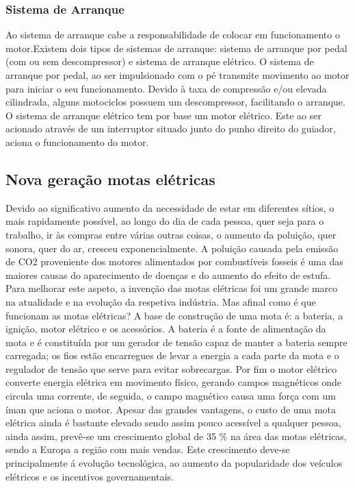 \documentclass{report}
\begin{document}
\subsubsection{Sistema de Arranque}
Ao sistema de arranque cabe a responsabilidade de colocar em funcionamento o motor.Existem dois tipos de sistemas de arranque: sistema de arranque por pedal (com ou sem descompressor) e sistema de arranque elétrico.
O sistema de arranque por pedal, ao ser impulsionado com o pé transmite movimento ao motor para iniciar o seu funcionamento. Devido à taxa de compressão e/ou elevada cilindrada, alguns motociclos possuem um descompressor, facilitando o arranque.
O sistema de arranque elétrico tem por base um motor elétrico. Este ao ser acionado através de um interruptor situado junto do punho direito do guiador, aciona o funcionamento do motor.
\subsection{Nova geração motas elétricas}
Devido ao significativo aumento da necessidade de estar em diferentes sítios, o mais rapidamente possível, ao longo do dia de cada pessoa, quer seja para o trabalho, ir às compras entre várias outras coisas, o aumento da poluição, quer sonora, quer do ar, cresceu exponencialmente.
A poluição causada pela emissão de CO2 proveniente dos motores alimentados por combustíveis fosseis é uma das maiores causas do aparecimento de doenças e do aumento do efeito de estufa. Para melhorar este aspeto, a invenção das motas elétricas foi um grande marco na atualidade e na evolução da respetiva indústria. Mas afinal como é que funcionam as motas elétricas? A base de construção de uma mota é: a bateria, a ignição, motor elétrico e os acessórios. A bateria é a fonte de alimentação da mota e é constituída por um gerador de tensão capaz de manter a bateria sempre carregada; os fios estão encarregues de levar a energia a cada parte da mota e o regulador de tensão que serve para evitar sobrecargas. Por fim o motor elétrico converte energia elétrica em movimento físico, gerando campos magnéticos onde circula uma corrente, de seguida, o campo magnético causa uma força com um íman que aciona o motor.   
Apesar das grandes vantagens, o custo de uma mota elétrica ainda é bastante elevado sendo assim pouco acessível a qualquer pessoa, ainda assim, prevê-se um crescimento global de 35 \% na área das motas elétricas, sendo a Europa a região com mais vendas. Este crescimento deve-se principalmente á evolução tecnológica, ao aumento da popularidade dos veículos elétricos e os incentivos governamentais.
\end{document}
